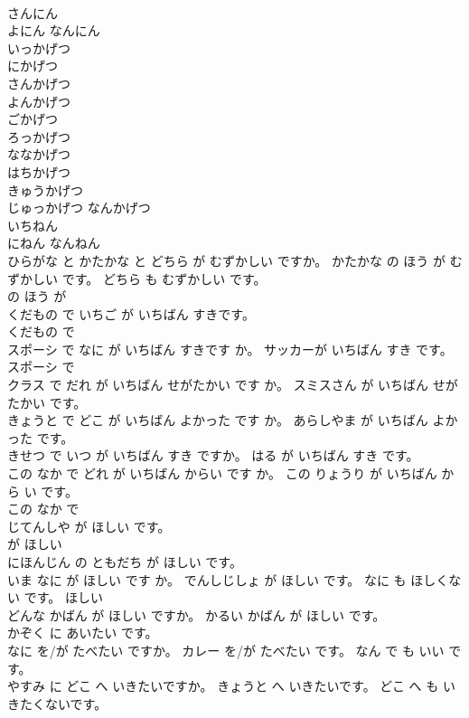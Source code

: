 \documentclass[8pt]{extreport}
\begin{document}
\begin{CJK}{UTF8}{min}
\\	さんにん 
\\	よにん なんにん	
\\	いっかげつ 
\\	にかげつ 
\\	さんかげつ 
\\	よんかげつ 
\\	ごかげつ 
\\	ろっかげつ 
\\	ななかげつ 
\\	はちかげつ 
\\	きゅうかげつ 
\\	じゅっかげつ なんかげつ	
\\	いちねん 
\\	にねん なんねん	
\\	ひらがな と かたかな と どちら が むずかしい ですか。 かたかな の ほう が むずかしい です。 どちら も むずかしい です。	
\\	の ほう が 
\\	くだもの で いちご が いちばん すきです。	
\\	くだもの で 
\\	スポーシ で なに が いちばん すきです か。 サッカーが いちばん すき です。	
\\	スポーシ で 
\\	クラス で だれ が いちばん せがたかい です か。 スミスさん が いちばん せがたかい です。	
\\	きょうと で どこ が いちばん よかった です か。 あらしやま が いちばん よかった です。	
\\	きせつ で いつ が いちばん すき ですか。 はる が いちばん すき です。	
\\	この なか で どれ が いちばん からい です か。 この りょうり が いちばん から い です。	
\\	この なか で 
\\	[わたしは]じてんしや が ほしい です。	
\\	が ほしい 
\\	[わたしは] にほんじん の ともだち が ほしい です。	
\\	いま なに が ほしい です か。 でんしじしょ が ほしい です。 なに も ほしくない です。	ほしい 
\\	どんな かばん が ほしい ですか。 かるい かばん が ほしい です。	
\\	[わたしは] かぞく に あいたい です。	
\\	なに を/が たべたい ですか。 カレー を/が たべたい です。 なん で も いい です。	
\\	やすみ に どこ へ いきたいですか。 きょうと へ いきたいです。 どこ へ も いきたくないです。	

\end{CJK}
\end{document}
